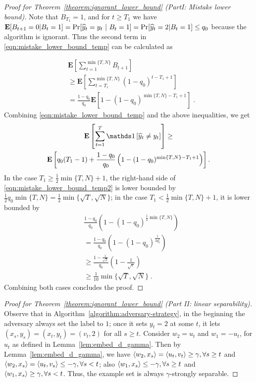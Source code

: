 \begin{proof}[Proof for Theorem~\ref{theorem:ignorant_lower_bound} (PartI: Mistake lower bound)]
Note that $B_{T_1}=1$, and for $t \ge T_1$ we have
$\operatorname*{\mathbf{E}}[B_{t+1}=0|B_t=1]=\Pr[\widehat y_t=y_t~|~B_t=1] = \Pr[\widehat y_t=2|B_t=1] \le
q_0$ because the algorithm is ignorant. Thus the second term in
\eqref{eqn:mistake_lower_bound_temp} can be calculated as

\begin{align*}
& \mathbf{E}\left[\sum_{t=1}^{\min\{T,N\}}B_{t+1}\right] \\
& \ge \mathbf{E}\left[\sum_{t=T_1}^{\min\{ T,N \}} (1-q_0)^{t-T_1+1} \right] \\
& = \frac{1-q_0}{q_0}\mathbf{E}\left[1-(1-q_0)^{\min\{T,N\}-T_1+1}\right] \; .
\end{align*}
Combining \eqref{eqn:mistake_lower_bound_temp} and the above inequalities, we get
\begin{multline}
\label{eqn:mistake_lower_bound_temp2}
\mathbf{E} \left[\sum_{t=1}^T \indicator{\widehat y_t\neq y_t}\right] \ge
\\ \mathbf{E}\left[q_0(T_1-1)+\frac{1-q_0}{q_0}\left(1-(1-q_0)^{\min\{T,N\}-T_1+1}\right)\right].
\end{multline}
In the case $T_1\geq \frac{1}{2}\min\{T,N\}+1$, the right-hand side of
\eqref{eqn:mistake_lower_bound_temp2} is lower bounded by
$\frac{1}{2}q_0\min\{T,N\}=\frac{1}{2}\min\{\sqrt{T}, \sqrt{N}\}$; in the case
$T_1< \frac{1}{2}\min\{T,N\}+1$, it is lower bounded by
\begin{align*}
& \frac{1-q_0}{q_0}\left(1-(1-q_0)^{\frac{1}{2}\min\{T,N\}}\right) \\
& = \frac{1-q_0}{q_0}\left(1-(1-q_0)^{\frac{1}{2q_0^2}}\right) \\
& \ge \frac{1-\frac{1}{\sqrt{2}}}{q_0}\left(1-\frac{1}{\sqrt{e}}\right) \\
& \ge \frac{1}{10}\min\{\sqrt{T}, \sqrt{N}\} \; .
\end{align*}
Combining both cases concludes the proof.
\end{proof}

\begin{proof}[Proof for Theorem~\ref{theorem:ignorant_lower_bound} (Part II: linear separability)]
Observe that in Algorithm~\ref{algorithm:adversary-strategy}, in the beginning
the adversary always set the label to $1$; once it sets $y_t=2$ at some $t$, it
lets $(x_s, y_s)=(x_t, y_t)=(v_t, 2)$ for all $s\geq t$. Consider $w_2=u_t$ and
$w_1=-u_t$, for $u_t$ as defined in Lemma~\ref{lem:embed_d_gamma}. Then by
Lemma~\ref{lem:embed_d_gamma}, we have $\left\langle w_2, x_s \right\rangle = \left\langle u_t, v_t \right\rangle \geq
\gamma, \forall s \geq t$ and $\left\langle w_2, x_s \right\rangle = \left\langle u_t, v_s \right\rangle \leq - \gamma,
\forall s< t$; also $\left\langle w_1, x_s \right\rangle \leq -\gamma, \forall s \geq t$ and
$\left\langle w_1, x_s \right\rangle \geq  \gamma, \forall s<t$. Thus, the example set is always
$\gamma$-strongly separable.
\end{proof}
